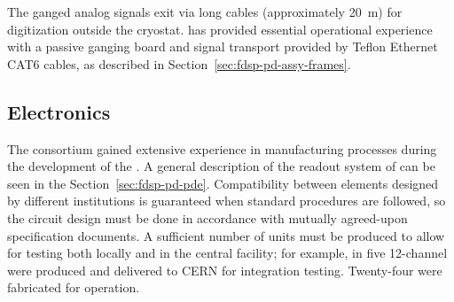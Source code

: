 The ganged analog signals exit via long cables (approximately \SI{20}{m}) for digitization outside the cryostat.
 has provided essential operational experience with a passive ganging board and signal transport provided by Teflon Ethernet CAT6 cables, as described in Section~\ref{sec:fdsp-pd-assy-frames}.


\subsection{Electronics}
\label{sec:fdsp-pd-assy-pde}

The  consortium gained extensive experience in manufacturing processes %
during the development of the  . %
A general description of the readout system of  can be seen in the Section~\ref{sec:fdsp-pd-pde}. Compatibility between elements designed by different institutions is guaranteed when standard procedures are followed, so the circuit design must be done in accordance with mutually agreed-upon specification documents.  A sufficient  number of units must be produced to allow %
for testing both locally and  in the central facility; for example, in  five 12-channel   were produced and delivered to CERN for integration testing. Twenty-four were fabricated for  operation. 

